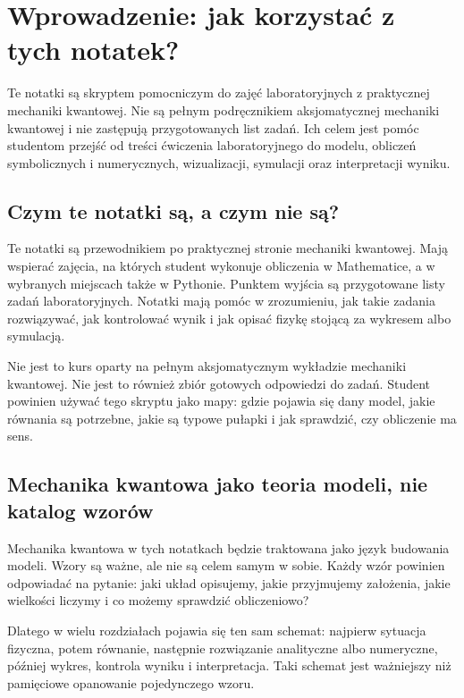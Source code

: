 \chapter*{Wprowadzenie: jak korzystać z tych notatek?}
\setcounter{section}{0}

\begin{summarybox}
Te notatki są skryptem pomocniczym do zajęć laboratoryjnych z praktycznej
mechaniki kwantowej. Nie są pełnym podręcznikiem aksjomatycznej mechaniki
kwantowej i nie zastępują przygotowanych list zadań. Ich celem jest pomóc
studentom przejść od treści ćwiczenia laboratoryjnego do modelu, obliczeń
symbolicznych i numerycznych, wizualizacji, symulacji oraz interpretacji wyniku.
\end{summarybox}

\section{Czym te notatki są, a czym nie są?}

Te notatki są przewodnikiem po praktycznej stronie mechaniki kwantowej. Mają
wspierać zajęcia, na których student wykonuje obliczenia w Mathematice, a w
wybranych miejscach także w Pythonie. Punktem wyjścia są przygotowane listy
zadań laboratoryjnych. Notatki mają pomóc w zrozumieniu, jak takie zadania
rozwiązywać, jak kontrolować wynik i jak opisać fizykę stojącą za wykresem albo
symulacją.

Nie jest to kurs oparty na pełnym aksjomatycznym wykładzie mechaniki kwantowej.
Nie jest to również zbiór gotowych odpowiedzi do zadań. Student powinien używać
tego skryptu jako mapy: gdzie pojawia się dany model, jakie równania są
potrzebne, jakie są typowe pułapki i jak sprawdzić, czy obliczenie ma sens.

\section{Mechanika kwantowa jako teoria modeli, nie katalog wzorów}

Mechanika kwantowa w tych notatkach będzie traktowana jako język budowania
modeli. Wzory są ważne, ale nie są celem samym w sobie. Każdy wzór powinien
odpowiadać na pytanie: jaki układ opisujemy, jakie przyjmujemy założenia, jakie
wielkości liczymy i co możemy sprawdzić obliczeniowo?

Dlatego w wielu rozdziałach pojawia się ten sam schemat: najpierw sytuacja
fizyczna, potem równanie, następnie rozwiązanie analityczne albo numeryczne,
później wykres, kontrola wyniku i interpretacja. Taki schemat jest ważniejszy niż
pamięciowe opanowanie pojedynczego wzoru.

